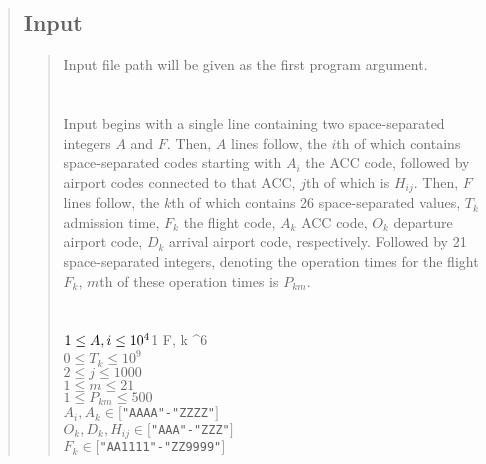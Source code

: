 \documentclass[10pt]{article}
\begin{document}
\begin{quote}

\subsection{Input}
\begin{quote}
Input file path will be given as the first program argument. \\

\iffalse
Input file format:
    1. First line: <number of ACCs> <number of flights>
    2. Next <number of ACCs> lines: <ACC code> <airport code> <airport code> ... <airport code>
    3. Next <number of flights> lines: <admission time> <flight code> <ACC code> <departure airport code> <arrival airport code> <list of operation times>
\fi

\vspace{-0.2cm}
\\  \\
Input begins with a single line containing two space-separated integers $A$ and $F$. Then, $A$ lines follow, the $i$th of which contains space-separated codes starting with $A_{i}$ the ACC code, followed by airport codes connected to that ACC, $j$th of which is $H_{ij}$. Then, $F$ lines follow, the $k$th of which contains 26 space-separated values, $T_{k}$ admission time, $F_{k}$ the flight code, $A_{k}$ ACC code, $O_{k}$ departure airport code, $D_{k}$ arrival airport code, respectively. Followed by 21 space-separated integers, denoting the operation times for the flight $F_{k}$, $m$th of these operation times is $P_{km}$. \\

\goodbreak
\vspace{-0.2cm}
\\  \\
$1 \leq A, i \leq 10^{4} \\ 
$1 \leq F, k  ^{6} \\
$0 \leq T_{k} \leq 10^{9}$ \\
$2 \leq j \leq 1000$ \\ %
$1 \leq m \leq 21$ \\ %
$1 \leq P_{km} \leq 500$ \\ %
$A_{i}, A_{k} \in [$\texttt{"AAAA"-}\texttt{"ZZZZ"}$]$ \\
$O_{k}, D_{k}, H_{ij} \in [$\texttt{"AAA"-}\texttt{"ZZZ"}$]$ \\
$F_{k} \in [$\texttt{"AA1111"-}\texttt{"ZZ9999"}$]$ 
\end{quote}


\end{quote}
\end{document}
